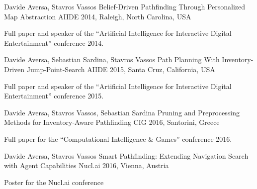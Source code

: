 


\begin{cventries}


\cventry
{Davide Aversa, Stavros Vassos} %
{Belief-Driven Pathfinding Through Personalized Map Abstraction} %
{AIIDE} %
{2014, Raleigh, North Carolina, USA} %
{ %
\begin{cvitems}
\item {Full paper and speaker of the ``Artificial Intelligence for Interactive Digital Entertainment'' conference 2014.}
\end{cvitems}
}


\cventry
{Davide Aversa, Sebastian Sardina, Stavros Vassos} %
{Path Planning With Inventory-Driven Jump-Point-Search} %
{AIIDE} %
{2015, Santa Cruz, California, USA} %
{ %
\begin{cvitems}
\item {Full paper and speaker of the ``Artificial Intelligence for Interactive Digital Entertainment'' conference 2015.}
\end{cvitems}
}


\cventry
{Davide Aversa, Stavros Vassos, Sebastian Sardina} %
{Pruning and Preprocessing Methods for Inventory-Aware Pathfinding} %
{CIG} %
{2016, Santorini, Greece} %
{ %
\begin{cvitems}
	\item {Full paper for the ``Computational Intelligence \& Games'' conference 2016.}
\end{cvitems}
}


\cventry
{Davide Aversa, Stavros Vassos} %
{Smart Pathfinding: Extending Navigation Search with Agent Capabilities} %
{Nucl.ai} %
{2016, Vienna, Austria} %
{ %
	\begin{cvitems}
		\item {Poster for the Nucl.ai conference}
	\end{cvitems}
}


\end{cventries}
